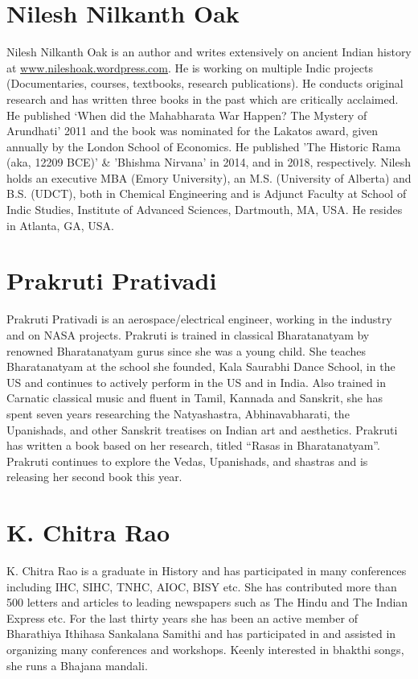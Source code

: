\section*{Nilesh Nilkanth Oak}

Nilesh Nilkanth Oak is an author and writes extensively on ancient Indian history at \url{www.nileshoak.wordpress.com}. He is working on multiple Indic projects (Documentaries, courses, textbooks, research publications). He conducts original research and has written three books in the past which are critically acclaimed. He published ‘When did the Mahabharata War Happen? The Mystery of Arundhati’ 2011 and the book was nominated for the Lakatos award, given annually by the London School of Economics. He published 'The Historic Rama (aka, 12209 BCE)' \& 'Bhishma Nirvana' in 2014, and in 2018, respectively. Nilesh holds an executive MBA (Emory University), an M.S. (University of Alberta) and B.S. (UDCT), both in Chemical Engineering and is Adjunct Faculty at School of Indic Studies, Institute of Advanced Sciences, Dartmouth, MA, USA. He resides in Atlanta, GA, USA.

\section*{Prakruti Prativadi}

Prakruti Prativadi is an aerospace/electrical engineer, working in the industry and on NASA projects. Prakruti is trained in classical Bharatanatyam by renowned Bharatanatyam gurus since she was a young child. She teaches Bharatanatyam at the school she founded, Kala Saurabhi Dance School, in the US and continues to actively perform in the US and in India. Also trained in Carnatic classical music and fluent in Tamil, Kannada and Sanskrit, she has spent seven years researching the Natyashastra, Abhinavabharati, the Upanishads, and other Sanskrit treatises on Indian art and aesthetics. Prakruti has written a book based on her research, titled “Rasas in Bharatanatyam”. Prakruti continues to explore the Vedas, Upanishads, and shastras and is releasing her second book this year.

\section*{K. Chitra Rao}

K. Chitra Rao is a graduate in History and has participated in many conferences including IHC, SIHC, TNHC, AIOC, BISY etc. She has contributed more than 500 letters and articles to leading newspapers such as The Hindu and The Indian Express etc. For the last thirty years she has been an active member of Bharathiya Ithihasa Sankalana Samithi and has participated in and assisted in organizing many conferences and workshops. Keenly interested in bhakthi songs, she runs a Bhajana mandali.

